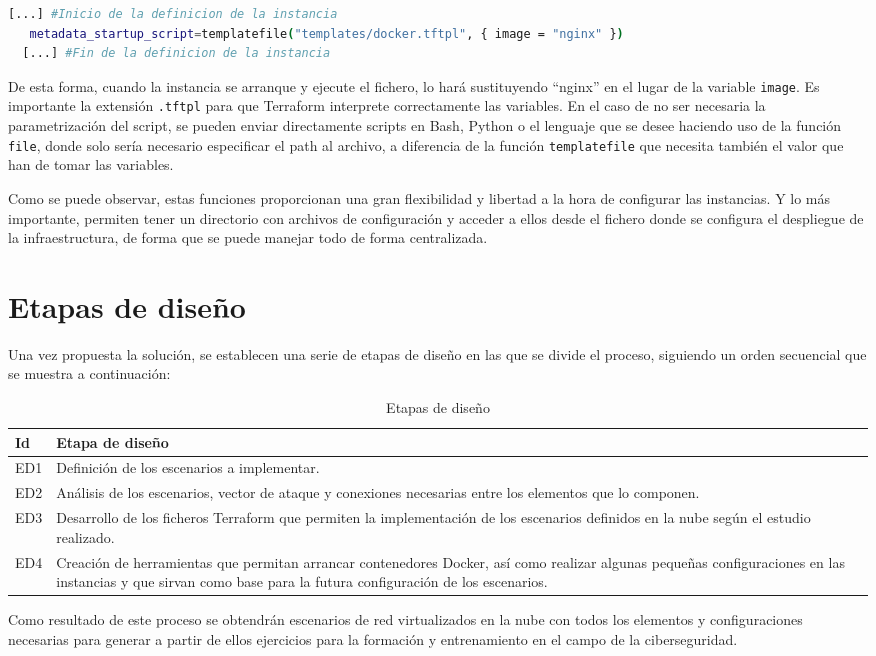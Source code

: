  \begin{lstlisting}[language=Bash, caption=Extracto de fichero de configuración \texttt{.tf}]
  [...] #Inicio de la definicion de la instancia
   metadata_startup_script=templatefile("templates/docker.tftpl", { image = "nginx" })
  [...] #Fin de la definicion de la instancia\end{lstlisting}

  De esta forma, cuando la instancia se arranque y ejecute el fichero, lo hará sustituyendo “nginx” en el lugar de la variable \texttt{image}. Es importante la extensión \texttt{.tftpl} para que Terraform interprete correctamente las variables. En el caso de no ser necesaria la parametrización del script, se pueden enviar directamente scripts en Bash, Python o el lenguaje que se desee haciendo uso de la función \texttt{file}, donde solo sería necesario especificar el path al archivo, a diferencia de la función \texttt{templatefile} que necesita también el valor que han de tomar las variables.

  Como se puede observar, estas funciones proporcionan una gran flexibilidad y libertad a la hora de configurar las instancias. Y lo más importante, permiten tener un directorio con archivos de configuración y acceder a ellos desde el fichero donde se configura el despliegue de la infraestructura, de forma que se puede manejar todo de forma centralizada.

\section{Etapas de diseño} \label{sec:etp}
Una vez propuesta la solución, se establecen una serie de etapas de diseño en las que se divide el proceso, siguiendo un orden secuencial que se muestra a continuación:


  \begin{table}[h]
    \begin{center}
      \begin{tabular}{ | w{c}{1cm} | m{14cm} | }
        \hline{} \textbf{Id} & \textbf{Etapa de diseño} \\ \hline
        ED1 & Definición de los escenarios a implementar. \\ \hline{}
        ED2 & Análisis de los escenarios, vector de ataque y conexiones necesarias entre los elementos que lo componen. \\ \hline
        ED3 & Desarrollo de los ficheros Terraform que permiten la implementación de los escenarios definidos en la nube según el estudio realizado.  \\ \hline{}
        ED4 & Creación de herramientas que permitan arrancar contenedores Docker, así como realizar algunas pequeñas configuraciones en las instancias y que sirvan como base para la futura configuración de los escenarios. \\ \hline
      \end{tabular}
      \caption{Etapas de diseño}
      \label{tab:etps}
    \end{center}
  \end{table}

  Como resultado de este proceso se obtendrán escenarios de red virtualizados en la nube con todos los elementos y configuraciones necesarias para generar a partir de ellos ejercicios para la formación y entrenamiento en el campo de la ciberseguridad.
